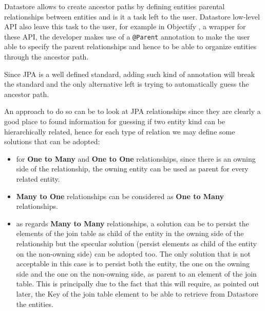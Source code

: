 \noindent Datastore allows to create ancestor paths by defining entities parental relationships between entities and is it a task left to the user. Datastore low-level API also leave this task to the user, for example in Objectify \cite{online:objectify}, a wrapper for these API, the developer makes use of a \texttt{@Parent} annotation to make the user able to specify the parent relationships and hence to be able to organize entities through the ancestor path.

\noindent Since JPA is a well defined standard, adding such kind of annotation will break the standard and the only alternative left is trying to automatically guess the ancestor path.

\noindent An approach to do so can be to look at JPA relationships since they are clearly a good place to found information for guessing if two entity kind can be hierarchically related, hence for each type of relation we may define some solutions that can be adopted:
\begin{itemize}
\item for \textbf{One to Many} and \textbf{One to One} relationships, since there is an owning side of the relationship, the owning entity can be used as parent for every related entity. 
\item \textbf{Many to One} relationships can be considered as \textbf{One to Many} relationships. 
\item as regards \textbf{Many to Many} relationships, a solution can be to persist the elements of the join table as child of the entity in the owning side of the relationship but the specular solution (persist elements as child of the entity on the non-owning side) can be adopted too. The only solution that is not acceptable in this case is to persist both the entity, the one on the owning side and the one on the non-owning side, as parent to an element of the join table. This is principally due to the fact that this will require, as pointed out later, the Key of the join table element to be able to retrieve from Datastore the entities.
\end{itemize}


